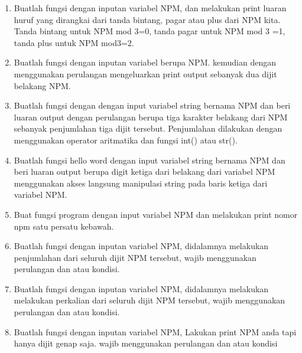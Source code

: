 \begin{enumerate}
	\item Buatlah fungsi dengan inputan variabel NPM, dan melakukan print luaran huruf yang dirangkai dari tanda bintang, pagar atau plus dari NPM kita. Tanda bintang untuk NPM mod 3=0, tanda pagar untuk NPM mod 3 =1, tanda plus untuk NPM mod3=2.
	
	
	\item Buatlah fungsi dengan inputan variabel berupa NPM. kemudian dengan menggunakan perulangan mengeluarkan print output sebanyak dua dijit belakang
	NPM.
	
	
	\item Buatlah fungsi dengan dengan input variabel string bernama NPM dan beri
	luaran output dengan perulangan berupa tiga karakter belakang dari NPM sebanyak penjumlahan tiga dijit tersebut. Penjumlahan dilakukan dengan menggunakan operator aritmatika dan fungsi int() atau str().
	
	
	\item Buatlah fungsi hello word dengan input variabel string bernama NPM dan beri luaran output berupa digit ketiga dari belakang dari variabel NPM menggunakan akses langsung manipulasi string pada baris ketiga dari variabel NPM.
	
	
	\item Buat fungsi program dengan input variabel NPM dan melakukan print nomor npm satu persatu kebawah.
	
	
	\item Buatlah fungsi dengan inputan variabel NPM, didalamnya melakukan penjumlahan dari seluruh dijit NPM tersebut, wajib menggunakan perulangan dan
	atau kondisi.
	
	
	\item Buatlah fungsi dengan inputan variabel NPM, didalamnya melakukan melakukan perkalian dari seluruh dijit NPM tersebut, wajib menggunakan perulangan dan atau kondisi.
	
	
	\item Buatlah fungsi dengan inputan variabel NPM, Lakukan print NPM anda tapi hanya dijit genap saja. wajib menggunakan perulangan dan atau kondisi
	
	

\end{enumerate}
